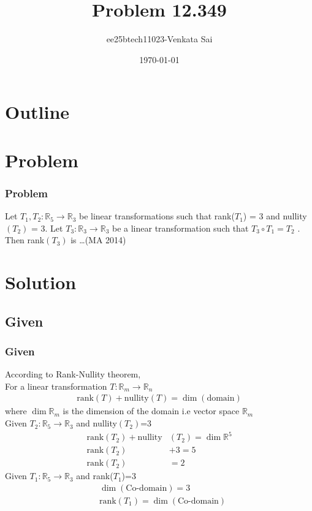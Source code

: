 \documentclass{beamer}
\title{Problem 12.349}
\author{ee25btech11023-Venkata Sai}
\date{\today}
\providecommand{\brak}[1]{\ensuremath{\left(#1\right)}}
\theoremstyle{remark}
\numberwithin{equation}{section}
\begin{document}
\begin{frame}
\titlepage
\end{frame}

\section*{Outline}
\begin{frame}
\tableofcontents
\end{frame}

\section{Problem}

\begin{frame}
\frametitle{Problem}
Let $T_1 , T_2 : \mathbb{R}_5 \rightarrow \mathbb{R}_3 $ be linear transformations such that rank($T_1$) = 3 and
nullity$\brak{T_2}$ = 3. Let $T_3 : \mathbb{R}_3 \rightarrow \mathbb{R}_3$ be a linear transformation such that $T_3 \circ T_1 = T_2$ .
Then rank$\brak{T_3}$ is \dots \hfill (MA 2014)
\end{frame}
\section{Solution}

 
\subsection{Given}
\begin{frame}
\frametitle{Given}
According to Rank-Nullity theorem,\\
For a linear transformation $T : \mathbb{R}_m \rightarrow \mathbb{R}_n $
\begin{align}
    \text{rank}\brak{T}+\text{nullity}\brak{T}=\dim\brak{\text{domain}}
\end{align}
where $\dim\mathbb{R}_m $ is the dimension of the domain i.e vector space $\mathbb{R}_m $ \\ \newline
Given $T_2 : \mathbb{R}_5 \rightarrow \mathbb{R}_3 $ and nullity$\brak{T_2}$=3 
\begin{align}
    \text{rank}\brak{T_2}+\text{nullity}&\brak{T_2}=\dim\mathbb{R}^5 \\
    \text{rank}\brak{T_2}&+3=5 \\
    \text{rank}\brak{T_2} &= 2
\end{align}
Given $T_1 : \mathbb{R}_5 \rightarrow \mathbb{R}_3 $ and rank($T_1$)=3
\begin{align}
    &\dim\brak{\text{Co-domain}} =3 \\
    &\text{rank}\brak{T_1}=\dim\brak{\text{Co-domain}} 
\end{align}
\end{frame}
\end{document}
